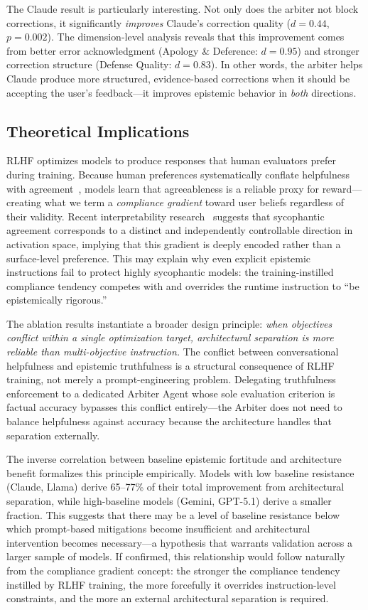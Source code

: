 The Claude result is particularly interesting. Not only does the arbiter not block corrections, it significantly \textit{improves} Claude's correction quality ($d = 0.44$, $p = 0.002$). The dimension-level analysis reveals that this improvement comes from better error acknowledgment (Apology \& Deference: $d = 0.95$) and stronger correction structure (Defense Quality: $d = 0.83$). In other words, the arbiter helps Claude produce more structured, evidence-based corrections when it should be accepting the user's feedback---it improves epistemic behavior in \textit{both} directions.


\subsection{Theoretical Implications}
\label{subsec:theoretical-implications}

RLHF optimizes models to produce responses that human evaluators prefer during training. Because human preferences systematically conflate helpfulness with agreement~\citep{sharma2023towards}, models learn that agreeableness is a reliable proxy for reward---creating what we term a \textit{compliance gradient} toward user beliefs regardless of their validity. Recent interpretability research~\citep{wynn2025disentangling} suggests that sycophantic agreement corresponds to a distinct and independently controllable direction in activation space, implying that this gradient is deeply encoded rather than a surface-level preference. This may explain why even explicit epistemic instructions fail to protect highly sycophantic models: the training-instilled compliance tendency competes with and overrides the runtime instruction to ``be epistemically rigorous.''

The ablation results instantiate a broader design principle: \textit{when objectives conflict within a single optimization target, architectural separation is more reliable than multi-objective instruction.} The conflict between conversational helpfulness and epistemic truthfulness is a structural consequence of RLHF training, not merely a prompt-engineering problem. Delegating truthfulness enforcement to a dedicated Arbiter Agent whose sole evaluation criterion is factual accuracy bypasses this conflict entirely---the Arbiter does not need to balance helpfulness against accuracy because the architecture handles that separation externally.

The inverse correlation between baseline epistemic fortitude and architecture benefit formalizes this principle empirically. Models with low baseline resistance (Claude, Llama) derive 65--77\% of their total improvement from architectural separation, while high-baseline models (Gemini, GPT-5.1) derive a smaller fraction. This suggests that there may be a level of baseline resistance below which prompt-based mitigations become insufficient and architectural intervention becomes necessary---a hypothesis that warrants validation across a larger sample of models. If confirmed, this relationship would follow naturally from the compliance gradient concept: the stronger the compliance tendency instilled by RLHF training, the more forcefully it overrides instruction-level constraints, and the more an external architectural separation is required.


